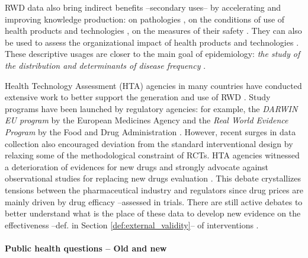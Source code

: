 \documentclass[french,12pt,twoside,a4paper]{book}
\begin{document}
RWD data also bring indirect benefits --secondary uses-- by accelerating and
improving knowledge production: on pathologies
\citep{campbell_characterizing_2022}, on the conditions of use of health
products and technologies \citep{safran_toward_2007,tuppin_value_2017}, on the
measures of their safety \citep{wisniewski_development_2003}. They can also be
used to assess the organizational impact of health products and technologies
\citep{has_guide_2020,has_real-world_2021}. These descriptive usages are closer
to the main goal of epidemiology: \textit{the study of the distribution
  and determinants of disease frequency} \citep{macmahon1970epidemiology}.

Health Technology Assessment (HTA) agencies in many countries have conducted
extensive work to better support the generation and use of RWD
\citep{fda_real-world_2021,has_real-world_2021,kent_nice_2022,plamondongenevieve_integration_2022}.
Study programs have been launched by regulatory agencies: for example, the \emph{DARWIN EU program}
by the European Medicines Agency and the \emph{Real World Evidence Program} by the Food
and Drug Administration \citep{fda_real_2018}. However, recent surges in data
collection also encouraged deviation from the standard interventional design by
relaxing some of the methodological constraint of RCTs. HTA agencies witnessed a
deterioration of evidences for new drugs and strongly advocate against
observational studies for replacing new drugs evaluation
\citep{wieseler2023replacing,vanier2023rapid}. This debate crystallizes tensions
between the pharmaceutical industry and regulators since drug prices are
mainly driven by drug efficacy --assessed in trials.
%
There are still active debates to better understand what is the place of these
data to develop new evidence on the effectiveness --def. in Section
\ref{def:external_validity}-- of interventions \citep{richesson_electronic_2013,wang2023emulation}.

\paragraph{Public health questions -- Old and new}
\end{document}
